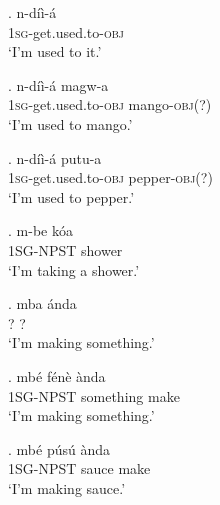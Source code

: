 \documentclass{assets/fieldnotes}
\begin{document}

\ex. n-d\'{i}\`{i}-\'{a}\\
\textsc{1sg}-get.used.to-\textsc{obj}\\
`I'm used to it.'

\ex. n-d\'{i}\`{i}-\'{a} ma\ng gw-a\\
\textsc{1sg}-get.used.to-\textsc{obj} mango-\textsc{obj}(?)\\
`I'm used to mango.'

\ex. n-d\'{i}\`{i}-\'{a} putu-a\\
\textsc{1sg}-get.used.to-\textsc{obj} pepper-\textsc{obj}(?)\\
`I'm used to pepper.'

\ex. m-be k\'{o}a\\
1\textsc{SG}-NPST shower\\
`I'm taking a shower.'

\ex. mba \textltailn \'{a}nda\\
? ?\\
`I'm making something.'\\

\ex. mb\'{e} f\'{e}n\`{e} \textltailn\`{a}nda\\
1\textsc{SG}-NPST something make\\
`I'm making something.'

\ex. mb\'{e} p\'{u}s\'{u} \textltailn\`{a}nda\\
1\textsc{SG}-NPST sauce make\\
`I'm making sauce.'
\end{document}
